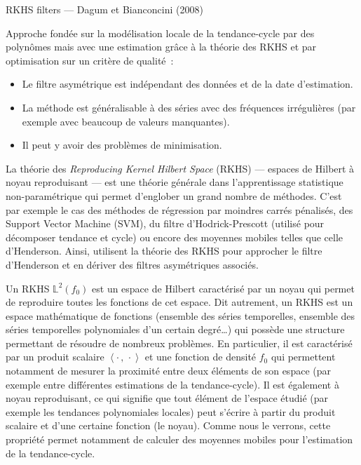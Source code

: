 \documentclass[
  12pt,
  a4paper,french]{article}
\newcommand\1{\mathds{1}}
\newcommand{\ps}[2]{\left\langle #1 \,,\, #2 \right\rangle}
\begin{document}
\begin{summary_box}{RKHS filters --- Dagum et Bianconcini (2008)}

Approche fondée sur la modélisation locale de la tendance-cycle par des polynômes mais avec une estimation grâce à la théorie des RKHS et par optimisation sur un critère de qualité~:

\begin{itemize}
\item
  Le filtre asymétrique est indépendant des données et de la date d'estimation.
\item
  La méthode est généralisable à des séries avec des fréquences irrégulières (par exemple avec beaucoup de valeurs manquantes).
\item
  Il peut y avoir des problèmes de minimisation.
\end{itemize}

\end{summary_box}

La théorie des \emph{Reproducing Kernel Hilbert Space} (RKHS) --- espaces de Hilbert à noyau reproduisant --- est une théorie générale dans l'apprentissage statistique non-paramétrique qui permet d'englober un grand nombre de méthodes.
C'est par exemple le cas des méthodes de régression par moindres carrés pénalisés, des Support Vector Machine (SVM), du filtre d'Hodrick-Prescott (utilisé pour décomposer tendance et cycle) ou encore des moyennes mobiles telles que celle d'Henderson.
Ainsi, \textcite{dagumbianconcini2008} utilisent la théorie des RKHS pour approcher le filtre d'Henderson et en dériver des filtres asymétriques associés.

Un RKHS \(\mathbb{L}^{2}(f_{0})\) est un espace de Hilbert caractérisé par un noyau qui permet de reproduire toutes les fonctions de cet espace.
Dit autrement, un RKHS est un espace mathématique de fonctions (ensemble des séries temporelles, ensemble des séries temporelles polynomiales d'un certain degré\ldots) qui possède une structure permettant de résoudre de nombreux problèmes.
En particulier, il est caractérisé par un produit scalaire \(\ps{\cdot}{\cdot}\) et une fonction de densité \(f_0\) qui permettent notamment de mesurer la proximité entre deux éléments de son espace (par exemple entre différentes estimations de la tendance-cycle).
Il est également à noyau reproduisant, ce qui signifie que tout élément de l'espace étudié (par exemple les tendances polynomiales locales) peut s'écrire à partir du produit scalaire et d'une certaine fonction (le noyau).
Comme nous le verrons, cette propriété permet notamment de calculer des moyennes mobiles pour l'estimation de la tendance-cycle.
\end{document}

